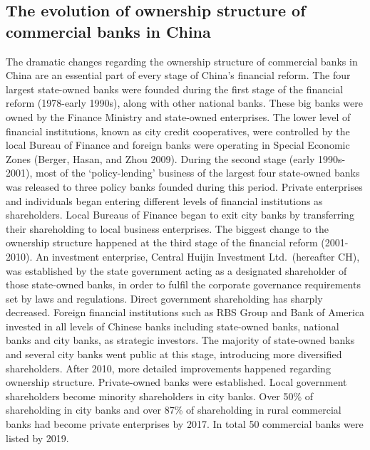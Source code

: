 \documentclass{article}
\begin{document}
\hypertarget{the-evolution-of-ownership-structure-of-commercial-banks-in-china}{%
\subsection{The evolution of ownership structure of commercial banks in
China}\label{the-evolution-of-ownership-structure-of-commercial-banks-in-china}}

The dramatic changes regarding the ownership structure of commercial
banks in China are an essential part of every stage of China's financial
reform. The four largest state-owned banks were founded during the first
stage of the financial reform (1978-early 1990s), along with other
national banks. These big banks were owned by the Finance Ministry and
state-owned enterprises. The lower level of financial institutions,
known as city credit cooperatives, were controlled by the local Bureau
of Finance and foreign banks were operating in Special Economic Zones
(Berger, Hasan, and Zhou 2009). During the second stage (early
1990s-2001), most of the `policy-lending' business of the largest four
state-owned banks was released to three policy banks founded during this
period. Private enterprises and individuals began entering different
levels of financial institutions as shareholders. Local Bureaus of
Finance began to exit city banks by transferring their shareholding to
local business enterprises. The biggest change to the ownership
structure happened at the third stage of the financial reform
(2001-2010). An investment enterprise, Central Huijin Investment
Ltd.~(hereafter CH), was established by the state government acting as a
designated shareholder of those state-owned banks, in order to fulfil
the corporate governance requirements set by laws and regulations.
Direct government shareholding has sharply decreased. Foreign financial
institutions such as RBS Group and Bank of America invested in all
levels of Chinese banks including state-owned banks, national banks and
city banks, as strategic investors. The majority of state-owned banks
and several city banks went public at this stage, introducing more
diversified shareholders. After 2010, more detailed improvements
happened regarding ownership structure. Private-owned banks were
established. Local government shareholders become minority shareholders
in city banks. Over 50\% of shareholding in city banks and over 87\% of
shareholding in rural commercial banks had become private enterprises by
2017. In total 50 commercial banks were listed by 2019.
\end{document}
